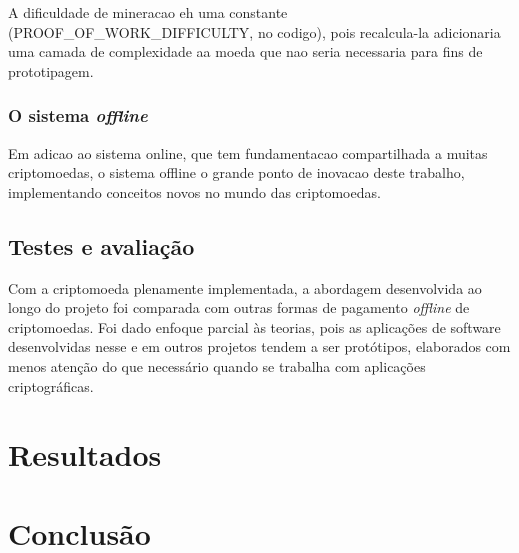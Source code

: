 \documentclass[
  12pt,
  a4paper,
  oneside,
  article,
]{abntex2}
\begin{document}
A dificuldade de mineracao eh uma constante (PROOF_OF_WORK_DIFFICULTY, no codigo), pois recalcula-la adicionaria uma camada de complexidade aa moeda que nao seria necessaria para fins de prototipagem.


\subsubsection{O sistema \textit{offline}}

Em adicao ao sistema online, que tem fundamentacao compartilhada a muitas criptomoedas, o sistema offline o grande ponto de inovacao deste trabalho, implementando conceitos novos no mundo das criptomoedas.



\subsection{Testes e avaliação}

Com a criptomoeda plenamente implementada, a abordagem desenvolvida ao longo do projeto foi comparada com outras formas de pagamento \textit{offline} de criptomoedas. Foi dado enfoque parcial às teorias, pois as aplicações de software desenvolvidas nesse e em outros projetos tendem a ser protótipos, elaborados com menos atenção do que necessário quando se trabalha com aplicações criptográficas.

\section{Resultados}

\section{Conclusão}

\newpage
\postextual
\printbibliography[title=REFERÊNCIAS]
\end{document}
